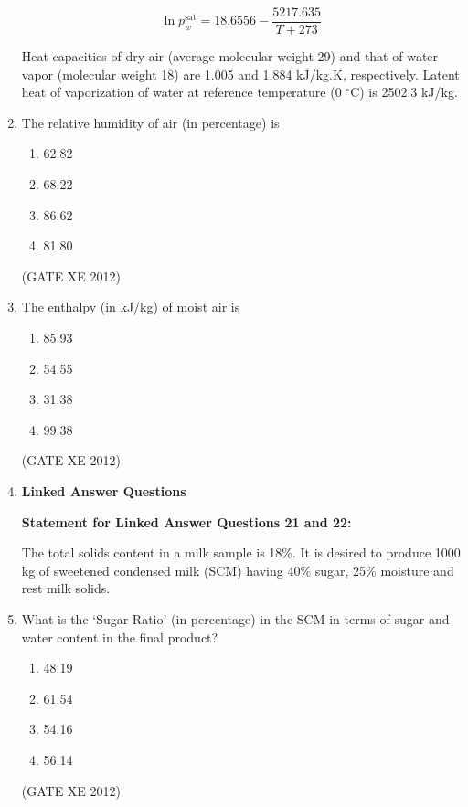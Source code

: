 \documentclass[12pt]{article}
\begin{document}
\begin{enumerate}
$$
\ln p_{w}^{\text{sat}} = 18.6556 - \frac{5217.635}{T+273}
$$

Heat capacities of dry air (average molecular weight 29) and that of water vapor (molecular weight 18) are 1.005 and 1.884 kJ/kg.K, respectively. Latent heat of vaporization of water at reference temperature (0 $^\circ$C) is 2502.3 kJ/kg.

\item The relative humidity of air (in percentage) is 

\begin{multicols}{4}
\begin{enumerate}
\item 62.82
\item 68.22
\item 86.62
\item 81.80
\end{enumerate}
\end{multicols}
(GATE XE 2012)

\item The enthalpy (in kJ/kg) of moist air is

\begin{multicols}{4}
\begin{enumerate}
\item 85.93
\item 54.55
\item 31.38
\item 99.38
\end{enumerate}
\end{multicols}
(GATE XE 2012)



\item[]  {\large \textbf{Linked Answer Questions}}

\textbf{Statement for Linked Answer Questions 21 and 22: }

 The total solids content in a milk sample is 18\%. It is desired to produce 1000 kg of sweetened condensed milk (SCM) having 40\% sugar, 25\% moisture and rest milk solids.

\item What is the ‘Sugar Ratio’ (in percentage) in the SCM in terms of sugar and water content in the final product?

\begin{multicols}{4}
\begin{enumerate}
\item 48.19
\item 61.54
\item 54.16
\item 56.14
\end{enumerate}
\end{multicols}
(GATE XE 2012)


\end{enumerate}
\end{document}
